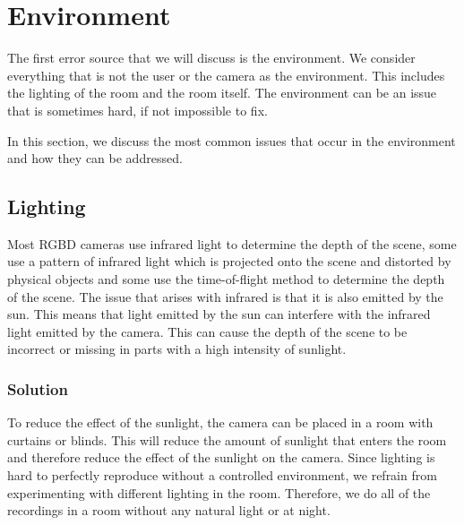 \section{Environment}

The first error source that we will discuss is the environment. We consider everything that is not the user or the camera as the environment. This includes the lighting of the room and the room itself. The environment can be an issue that is sometimes hard, if not impossible to fix. 

In this section, we discuss the most common issues that occur in the environment and how they can be addressed.



\subsection{Lighting}

Most RGBD cameras use infrared light to determine the depth of the scene, some use a pattern of infrared light which is projected onto the scene and distorted by physical objects and some use the time-of-flight method to determine the depth of the scene. The issue that arises with infrared is that it is also emitted by the sun. This means that light emitted by the sun can interfere with the infrared light emitted by the camera. This can cause the depth of the scene to be incorrect or missing in parts with a high intensity of sunlight.

\subsubsection{Solution}

To reduce the effect of the sunlight, the camera can be placed in a room with curtains or blinds. This will reduce the amount of sunlight that enters the room and therefore reduce the effect of the sunlight on the camera. Since lighting is hard to perfectly reproduce without a controlled environment, we refrain from experimenting with different lighting in the room. Therefore, we do all of the recordings in a room without any natural light or at night.

